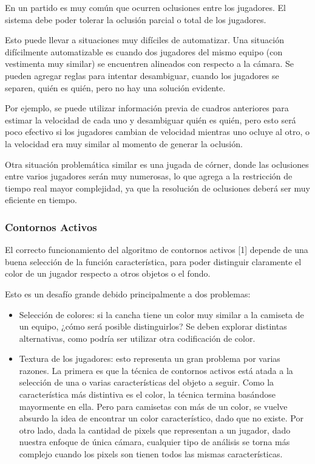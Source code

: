 \documentclass[a4paper,10pt]{article}
\begin{document}
En un partido es muy común que ocurren oclusiones entre los jugadores. El
sistema debe poder tolerar la oclusión parcial o total de los jugadores.

Esto puede llevar a situaciones muy difíciles de automatizar. Una situación
difícilmente automatizable es cuando dos jugadores del mismo equipo (con
vestimenta muy similar) se encuentren alineados con respecto a la cámara.
Se pueden agregar reglas para intentar desambiguar, cuando los jugadores se
separen, quién es quién, pero no hay una solución evidente.

Por ejemplo, se puede utilizar información previa de cuadros anteriores para
estimar la velocidad de cada uno y desambiguar quién es quién, pero esto
será poco efectivo si los jugadores cambian de velocidad mientras uno ocluye
al otro, o la velocidad era muy similar al momento de generar la oclusión.

Otra situación problemática similar es una jugada de córner, donde las
oclusiones entre varios jugadores serán muy numerosas, lo que agrega a la
restricción de tiempo real mayor complejidad, ya que la resolución de
oclusiones deberá ser muy eficiente en tiempo.

\subsubsection{Contornos Activos}

El correcto funcionamiento del algoritmo de contornos activos [1] depende
de una buena selección de la función característica, para poder distinguir
claramente el color de un jugador respecto a otros objetos o el fondo.

Esto es un desafío grande debido principalmente a dos problemas:
\begin{itemize}

\item Selección de colores: si la cancha tiene un color muy similar a la
  camiseta de un equipo, ¿cómo será posible distinguirlos? Se deben explorar
  distintas alternativas, como podría ser utilizar otra codificación de color.

\item Textura de los jugadores: esto representa un gran problema por varias
  razones. La primera es que la técnica de contornos activos está atada a la
  selección de una o varias características del objeto a seguir. Como la
  característica más distintiva es el color, la técnica termina basándose
  mayormente en ella. Pero para camisetas con más de un color, se vuelve
  absurdo la idea de encontrar un color característico, dado que no existe. Por
  otro lado, dada la cantidad de pixels que representan a un jugador, dado
  nuestra enfoque de única cámara, cualquier tipo de análisis se torna más
  complejo cuando los pixels son tienen todos las mismas características.

\end{itemize}
\end{document}
